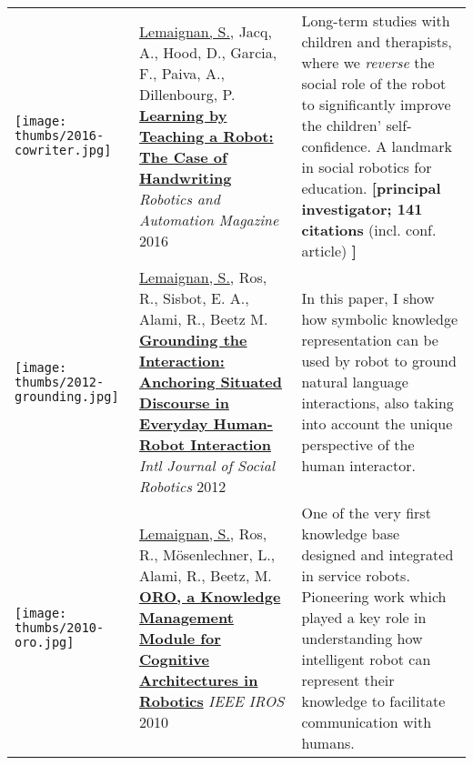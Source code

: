 {\begin{tabular}{p{1.7cm}p{7cm}p{8cm}}
    \vspace{-.20cm}\texttt{[image: thumbs/2016-cowriter.jpg]} &

    \ul{Lemaignan, S.}, Jacq, A., Hood, D., Garcia, F., Paiva, A., Dillenbourg, P.
    \newline
    \href{https://doi.org/10.1109/MRA.2016.2546700}{\textbf{Learning by
    Teaching a Robot: The Case of Handwriting}}
    \newline \textit{Robotics and Automation Magazine} 2016
    & \small Long-term studies with children and
    therapists, where we \emph{reverse} the social role of the
    robot to significantly improve the children' self-confidence. A landmark in
    social robotics for education. \textbf{\newline[principal investigator; 141
    citations} (incl. conf. article) \textbf{]}\\



    \vspace{-.20cm}\texttt{[image: thumbs/2012-grounding.jpg]} &

    \ul{Lemaignan, S.}, Ros, R., Sisbot, E. A., Alami, R., Beetz M.
    \href{https://doi.org/10.1007/s12369-011-0123-x}{\textbf{Grounding
    the Interaction: Anchoring Situated Discourse in Everyday Human-Robot
    Interaction}} 
    \newline \textit{Intl Journal of Social Robotics} 2012

    & \small In this paper, I show how symbolic knowledge representation can be
    used by robot to ground natural language interactions, also taking into
    account the unique perspective of the human interactor.
    \textbf{}\\

    \vspace{-.20cm}\texttt{[image: thumbs/2010-oro.jpg]} &
    \ul{Lemaignan, S.}, Ros, R., Mösenlechner, L., Alami, R., Beetz, M.
    \newline\href{https://doi.org/10.1109/IROS.2010.5649547}{\textbf{ORO, a Knowledge Management Module for Cognitive Architectures in
    Robotics}}
    \newline \textit{IEEE IROS} 2010

    & \small One of the very first knowledge base designed and
    integrated in service robots. Pioneering work which played a key role in
    understanding how intelligent robot can represent their
    knowledge to facilitate communication with humans.
    \textbf{}\\

\end{tabular}
}

